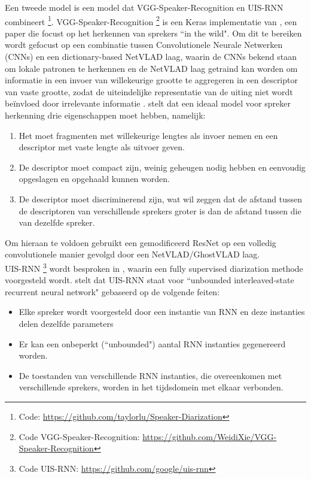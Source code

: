 Een tweede model is een model dat VGG-Speaker-Recognition en UIS-RNN combineert \footnote{Code: \url{https://github.com/taylorlu/Speaker-Diarization}}. VGG-Speaker-Recognition \footnote{Code VGG-Speaker-Recognition: \url{https://github.com/WeidiXie/VGG-Speaker-Recognition}} is een Keras implementatie van \textcite{Xie2019}, een paper die focust op het herkennen van sprekers ``in the wild". Om dit te bereiken wordt gefocust op een combinatie tussen Convolutionele Neurale Netwerken (CNNs) en een dictionary-based NetVLAD laag, waarin de CNNs bekend staan om lokale patronen te herkennen en de NetVLAD laag getraind kan worden om informatie in een invoer van willekeurige grootte te aggregeren in een descriptor van vaste grootte, zodat de uiteindelijke representatie van de uiting niet wordt beïnvloed door irrelevante informatie \autocite{Xie2019}.
\textcite{Xie2019} stelt dat een ideaal model voor spreker herkenning drie eigenschappen moet hebben, namelijk:
\begin{enumerate}
	\item Het moet fragmenten met willekeurige lengtes als invoer nemen en een descriptor met vaste lengte als uitvoer geven.
	\item De descriptor moet compact zijn, weinig geheugen nodig hebben en eenvoudig opgeslagen en opgehaald kunnen worden.
	\item De descriptor moet discriminerend zijn, wat wil zeggen dat de afstand tussen de descriptoren van verschillende sprekers groter is dan de afstand tussen die van dezelfde spreker.
\end{enumerate}
Om hieraan te voldoen gebruikt \textcite{Xie2019} een gemodificeerd ResNet op een volledig convolutionele manier gevolgd door een NetVLAD/GhostVLAD laag.\\
UIS-RNN \footnote{Code UIS-RNN: \url{https://github.com/google/uis-rnn}} wordt besproken in \textcite{Zhang2018}, waarin een fully supervised diarization methode voorgesteld wordt. \textcite{Zhang2018} stelt dat UIS-RNN staat voor ``unbounded interleaved-state recurrent neural network" gebaseerd op de volgende feiten:
\begin{itemize}
	\item Elke spreker wordt voorgesteld door een instantie van RNN en deze instanties delen dezelfde parameters
	\item Er kan een onbeperkt (``unbounded") aantal RNN instanties gegenereerd worden.
	\item De toestanden van verschillende RNN instanties, die overeenkomen met verschillende sprekers, worden in het tijdsdomein met elkaar verbonden.
\end{itemize}

